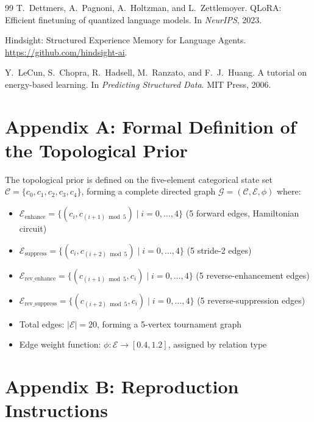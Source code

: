 \documentclass[11pt,a4paper]{article}
\begin{document}
\begin{thebibliography}{99}
T.~Dettmers, A.~Pagnoni, A.~Holtzman, and L.~Zettlemoyer.
\newblock QLoRA: Efficient finetuning of quantized language models.
\newblock In \textit{NeurIPS}, 2023.

Hindsight: Structured Experience Memory for Language Agents.
\newblock \url{https://github.com/hindsight-ai}.

Y.~LeCun, S.~Chopra, R.~Hadsell, M.~Ranzato, and F.~J.~Huang.
\newblock A tutorial on energy-based learning.
\newblock In \textit{Predicting Structured Data}. MIT Press, 2006.

\end{thebibliography}

\newpage
\section*{Appendix A: Formal Definition of the Topological Prior}

The topological prior is defined on the five-element categorical state set \(\mathcal{C} = \{c_0, c_1, c_2, c_3, c_4\}\), forming a complete directed graph \(\mathcal{G} = (\mathcal{C}, \mathcal{E}, \phi)\) where:

\begin{itemize}[itemsep=2pt]
    \item \(\mathcal{E}_{\text{enhance}} = \{(c_i, c_{(i+1)\bmod 5}) \mid i = 0, \ldots, 4\}\) (5 forward edges, Hamiltonian circuit)
    \item \(\mathcal{E}_{\text{suppress}} = \{(c_i, c_{(i+2)\bmod 5}) \mid i = 0, \ldots, 4\}\) (5 stride-2 edges)
    \item \(\mathcal{E}_{\text{rev\_enhance}} = \{(c_{(i+1)\bmod 5}, c_i) \mid i = 0, \ldots, 4\}\) (5 reverse-enhancement edges)
    \item \(\mathcal{E}_{\text{rev\_suppress}} = \{(c_{(i+2)\bmod 5}, c_i) \mid i = 0, \ldots, 4\}\) (5 reverse-suppression edges)
    \item Total edges: \(|\mathcal{E}| = 20\), forming a 5-vertex tournament graph
    \item Edge weight function: \(\phi: \mathcal{E} \to [0.4, 1.2]\), assigned by relation type
\end{itemize}

\section*{Appendix B: Reproduction Instructions}
\end{document}
